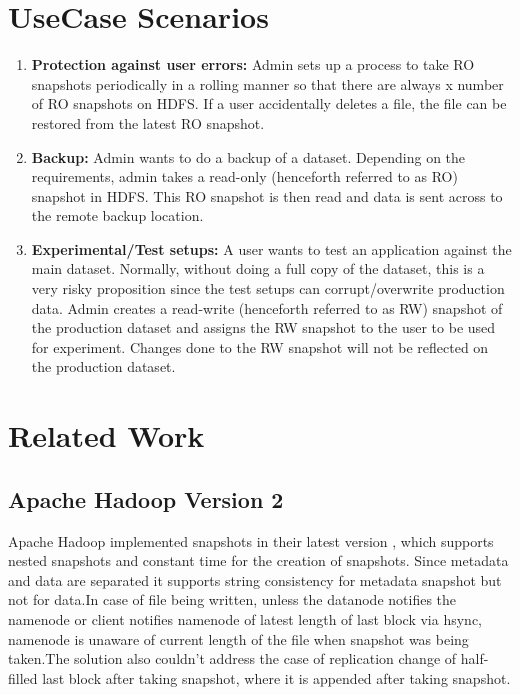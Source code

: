 \section{UseCase Scenarios}
\begin{enumerate}
\item \textbf{Protection against user errors:} Admin sets up a process to take RO snapshots periodically in a
rolling manner so that there are always x number of RO snapshots on HDFS. If a user
accidentally deletes a file, the file can be restored from the latest RO snapshot.
\item \textbf{Backup:} Admin wants to do a backup of a dataset. Depending on the requirements, admin takes
a read-only (henceforth referred to as RO) snapshot in HDFS. This RO snapshot is then read and
data is sent across to the remote backup location.
\item \textbf{Experimental/Test setups:} A user wants to test an application against the main dataset. Normally, without doing a full copy of the dataset, this is a very risky proposition since the test setups can corrupt/overwrite production data. Admin creates a read-write (henceforth referred to as RW) snapshot of the production dataset and assigns the RW snapshot to the user to be used for experiment. Changes done to the RW snapshot will not be reflected on the production dataset.

\end{enumerate}








\section{Related Work}

\subsection{Apache Hadoop Version 2}
Apache Hadoop implemented snapshots in their latest version \cite{Hadoop2} , which supports nested snapshots and constant time for the creation of snapshots. Since metadata and data are separated it supports string consistency for metadata snapshot but not for data.In case of file being written, unless the datanode notifies the namenode or client notifies namenode of latest length of last block via hsync, namenode is unaware of current length of the file when snapshot was being taken.The solution also couldn't address the case of replication change of half-filled last block after taking snapshot, where it is appended after taking snapshot.\\



